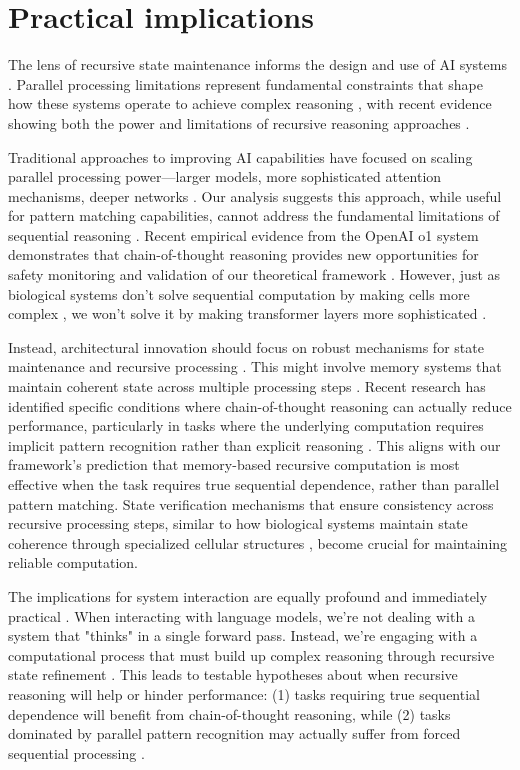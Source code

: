 \documentclass[12pt]{article}
\begin{document}
\section{Practical implications}

The lens of recursive state maintenance informs the design and use of AI systems \cite{dickson2024trust,ahn2024recursive,openai2024o1}.
Parallel processing limitations represent fundamental constraints that shape how these systems operate to achieve complex reasoning \cite{merrill2023parallelism}, with recent evidence showing both the power and limitations of recursive reasoning approaches \cite{liu2024mind}.

Traditional approaches to improving AI capabilities have focused on scaling parallel processing power---larger models, more sophisticated attention mechanisms, deeper networks \cite{shallue2019measuring}.
Our analysis suggests this approach, while useful for pattern matching capabilities, cannot address the fundamental limitations of sequential reasoning \cite{peng2024limitations}.
Recent empirical evidence from the OpenAI o1 system demonstrates that chain-of-thought reasoning provides new opportunities for safety monitoring and validation of our theoretical framework \cite{openai2024o1}.
However, just as biological systems don't solve sequential computation by making cells more complex \cite{wang2023parallel}, we won't solve it by making transformer layers more sophisticated \cite{zhao2024epha}.

Instead, architectural innovation should focus on robust mechanisms for state maintenance and recursive processing \cite{jung2020new}.
This might involve memory systems that maintain coherent state across multiple processing steps \cite{zhu2024overcoming}.
Recent research has identified specific conditions where chain-of-thought reasoning can actually reduce performance, particularly in tasks where the underlying computation requires implicit pattern recognition rather than explicit reasoning \cite{liu2024mind}.
This aligns with our framework's prediction that memory-based recursive computation is most effective when the task requires true sequential dependence, rather than parallel pattern matching.
State verification mechanisms that ensure consistency across recursive processing steps, similar to how biological systems maintain state coherence through specialized cellular structures \cite{espinosa2024molecular}, become crucial for maintaining reliable computation.

The implications for system interaction are equally profound and immediately practical \cite{wei2022chain}.
When interacting with language models, we're not dealing with a system that "thinks" in a single forward pass.
Instead, we're engaging with a computational process that must build up complex reasoning through recursive state refinement \cite{dickson2024trust}.
This leads to testable hypotheses about when recursive reasoning will help or hinder performance: (1) tasks requiring true sequential dependence will benefit from chain-of-thought reasoning, while (2) tasks dominated by parallel pattern recognition may actually suffer from forced sequential processing \cite{liu2024mind}.
\end{document}
